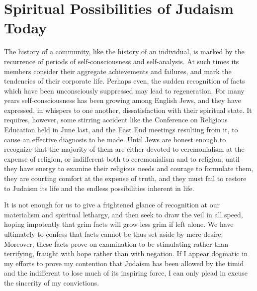 \chapter{Spiritual Possibilities of Judaism Today}

The history of a community, like the history of an 
individual, is marked by the recurrence of periods of
self-consciousness and self-analysis. At such times its members 
consider their aggregate achievements and failures, and 
mark the tendencies of their corporate life. Perhaps even, 
the sudden recognition of facts which have been unconsciously
suppressed may lead to regeneration. For many 
years self-consciousness has been growing among English 
Jews, and they have expressed, in whispers to one another, 
dissatisfaction with their spiritual state. It requires, 
however, some stirring accident like the Conference on 
Religious Education held in June last, and the East End 
meetings resulting from it, to cause an effective diagnosis to 
be made. Until Jews are honest enough to recognize that 
the majority of them are either devoted to ceremonialism at 
the expense of religion, or indifferent both to ceremonialism 
and to religion; until they have energy to examine their 
religious needs and courage to formulate them, they are 
courting comfort at the expense of truth, and they must fail 
to restore to Judaism its life and the endless possibilities 
inherent in life. 

It is not enough for us to give a frightened glance of 
recognition at our materialism and spiritual lethargy, and 
then seek to draw the veil in all speed, hoping impotently 
that grim facts will grow less grim if left alone. We have 
ultimately to confess that facts cannot be thus set aside by 
mere desire. Moreover, these facts prove on examination 
to be stimulating rather than terrifying, fraught with hope 
rather than with negation. If I appear dogmatic in my 
efforts to prove my contention that Judaism has been 
allowed by the timid and the indifferent to lose much 
of its inspiring force, I can only plead in excuse the 
sincerity of my convictions. 

